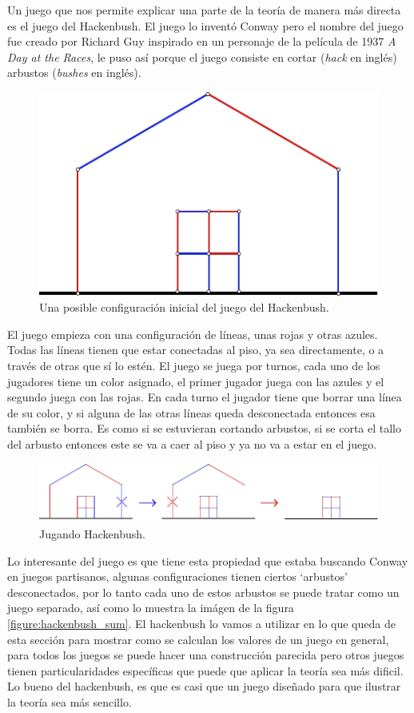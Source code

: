 Un juego que nos permite explicar una parte de la teor\'ia de manera m\'as directa es el juego del Hackenbush. El juego lo invent\'o Conway pero el nombre del juego fue creado por Richard Guy inspirado en un personaje de la pel\'icula de 1937 \textit{A Day at the Races}, le puso as\'i porque el juego consiste en cortar (\textit{hack} en ingl\'es) arbustos (\textit{bushes} en ingl\'es).

\begin{figure}[h]
    \centering
    \includegraphics[width=.7\textwidth]{images/hackenbush-first_example.pdf}
    \caption{Una posible configuraci\'on inicial del juego del Hackenbush.}
\end{figure}

El juego empieza con una configuraci\'on de l\'ineas, unas rojas y otras azules. Todas las l\'ineas tienen que estar conectadas al piso, ya sea directamente, o a trav\'es de otras que s\'i lo est\'en. El juego se juega por turnos, cada uno de los jugadores tiene un color asignado, el primer jugador juega con las azules y el segundo juega con las rojas. En cada turno el jugador tiene que borrar una l\'inea de su color, y si alguna de las otras l\'ineas queda desconectada entonces esa tambi\'en se borra. Es como si se estuvieran cortando arbustos, si se corta el tallo del arbusto entonces este se va a caer al piso y ya no va a estar en el juego.


\begin{figure}[h]
    \centering
    \includegraphics[width=.7\textwidth]{images/hackenbush-game_example.pdf}
    \caption{Jugando Hackenbush.}
\end{figure}


Lo interesante del juego es que tiene esta propiedad que estaba buscando Conway en juegos partisanos, algunas configuraciones tienen ciertos `arbustos' desconectados, por lo tanto cada uno de estos arbustos se puede tratar como un juego separado, as\'i como lo muestra la im\'agen de la figura \ref{figure:hackenbush_sum}. El hackenbush lo vamos a utilizar en lo que queda de esta secci\'on para mostrar como se calculan los valores de un juego en general, para todos los juegos se puede hacer una construcci\'on parecida pero otros juegos tienen particularidades espec\'ificas que puede que aplicar la teor\'ia sea m\'as dificil. Lo bueno del hackenbush, es que es casi que un juego diseñado para que ilustrar la teor\'ia sea m\'as sencillo.

